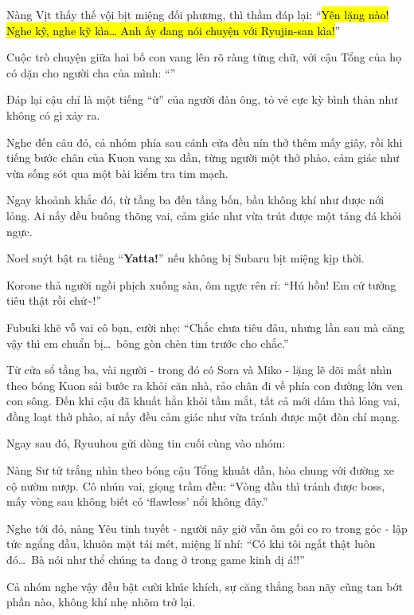 \documentclass[../main.tex]{subfiles}
\begin{document}
Nàng Vịt thấy thế vội bịt miệng đối phương, thì thầm đáp lại: ``\hl{Yên lặng nào! Nghe kỹ, nghe kỹ kìa\dots{} Anh ấy đang nói chuyện với Ryujin-san kìa!}''

Cuộc trò chuyện giữa hai bố con vang lên rõ ràng từng chữ, với cậu Tổng của họ có dặn cho người cha của mình: ``''

Đáp lại cậu chỉ là một tiếng ``ừ'' của người đàn ông, tỏ vẻ cực kỳ bình thản như không có gì xảy ra.

Nghe đến câu đó, cả nhóm phía sau cánh cửa đều nín thở thêm mấy giây, rồi khi tiếng bước chân của Kuon vang xa dần, từng người một thở phào, cảm giác như vừa sống sót qua một bài kiểm tra tim mạch.

Ngay khoảnh khắc đó, từ tầng ba đến tầng bốn, bầu không khí như được nới lỏng. Ai nấy đều buông thõng vai, cảm giác như vừa trút được một tảng đá khỏi ngực.

Noel suýt bật ra tiếng ``\textbf{Yatta!}'' nếu không bị Subaru bịt miệng kịp thời.

Korone thả người ngồi phịch xuống sàn, ôm ngực rên rỉ: ``Hú hồn! Em cứ tưởng tiêu thật rồi chứ\~{}!''

Fubuki khẽ vỗ vai cô bạn, cười nhẹ: ``Chắc chưa tiêu đâu, nhưng lần sau mà căng vậy thì em chuẩn bị\dots\ bông gòn chèn tim trước cho chắc.''

Từ cửa sổ tầng ba, vài người - trong đó có Sora và Miko - lặng lẽ dõi mắt nhìn theo bóng Kuon sải bước ra khỏi căn nhà, rảo chân đi về phía con đường lớn ven con sông. Đến khi cậu đã khuất hẳn khỏi tầm mắt, tất cả mới dám thả lỏng vai, đồng loạt thở phào, ai nấy đều cảm giác như vừa tránh được một đòn chí mạng.

Ngay sau đó, Ryuuhou gửi dòng tin cuối cùng vào nhóm:


Nàng Sư tử trắng nhìn theo bóng cậu Tổng khuất dần, hòa chung với đường xe cộ nườm nượp. Cô nhún vai, giọng trầm đều: ``Vòng đầu thì tránh được boss, mấy vòng sau không biết có `flawless' nổi không đây.''

Nghe tới đó, nàng Yêu tinh tuyết - người nãy giờ vẫn ôm gối co ro trong góc - lập tức ngẩng đầu, khuôn mặt tái mét, miệng lí nhí: ``Có khi tôi ngất thật luôn đó\dots\ Bà nói như thể chúng ta đang ở trong game kinh dị á!!''

Cả nhóm nghe vậy đều bật cười khúc khích, sự căng thẳng ban nãy cũng tan bớt phần nào, không khí nhẹ nhõm trở lại.
\end{document}
